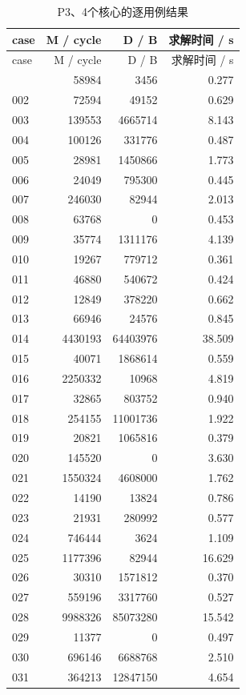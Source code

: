 \documentclass[anonymous,notoc]{gmcm2026}
\begin{document}
\begin{longtable}{lrrr}
\caption{P3、4个核心的逐用例结果}\\
\toprule
case & M / cycle & D / B & 求解时间 / s\\\midrule
\endfirsthead
\toprule
case & M / cycle & D / B & 求解时间 / s\\\midrule
\endhead
\bottomrule\endfoot
001 & 58984 & 3456 & 0.277 \\
002 & 72594 & 49152 & 0.629 \\
003 & 139553 & 4665714 & 8.143 \\
004 & 100126 & 331776 & 0.487 \\
005 & 28981 & 1450866 & 1.773 \\
006 & 24049 & 795300 & 0.445 \\
007 & 246030 & 82944 & 2.013 \\
008 & 63768 & 0 & 0.453 \\
009 & 35774 & 1311176 & 4.139 \\
010 & 19267 & 779712 & 0.361 \\
011 & 46880 & 540672 & 0.424 \\
012 & 12849 & 378220 & 0.662 \\
013 & 66946 & 24576 & 0.845 \\
014 & 4430193 & 64403976 & 38.509 \\
015 & 40071 & 1868614 & 0.559 \\
016 & 2250332 & 10968 & 4.819 \\
017 & 32865 & 803752 & 0.940 \\
018 & 254155 & 11001736 & 1.922 \\
019 & 20821 & 1065816 & 0.379 \\
020 & 145520 & 0 & 3.630 \\
021 & 1550324 & 4608000 & 1.762 \\
022 & 14190 & 13824 & 0.786 \\
023 & 21931 & 280992 & 0.577 \\
024 & 746444 & 3624 & 1.109 \\
025 & 1177396 & 82944 & 16.629 \\
026 & 30310 & 1571812 & 0.370 \\
027 & 559196 & 3317760 & 0.527 \\
028 & 9988326 & 85073280 & 15.542 \\
029 & 11377 & 0 & 0.497 \\
030 & 696146 & 6688768 & 2.510 \\
031 & 364213 & 12847150 & 4.654 \\

\end{longtable}
\end{document}
